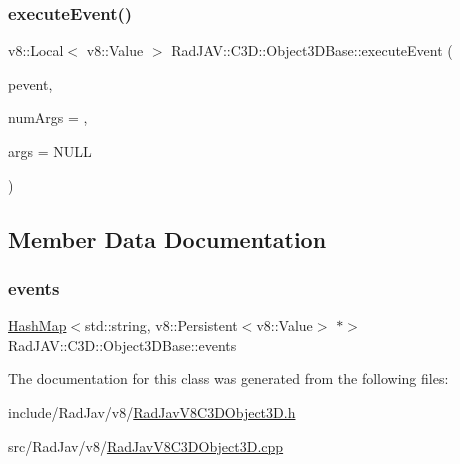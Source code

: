 \mbox{\label{class_rad_j_a_v_1_1_c3_d_1_1_object3_d_base_a802e5138705d77e4ceb1e4f02e879fd8}} 
\subsubsection{\texorpdfstring{execute\+Event()}{executeEvent()}}
{\footnotesize\ttfamily v8\+::\+Local$<$ v8\+::\+Value $>$ Rad\+J\+A\+V\+::\+C3\+D\+::\+Object3\+D\+Base\+::execute\+Event (\begin{DoxyParamCaption}\item[{v8\+::\+Persistent$<$ v8\+::\+Value $>$ $\ast$}]{pevent,  }\item[{R\+J\+I\+NT}]{num\+Args = {},  }\item[{v8\+::\+Local$<$ v8\+::\+Value $>$ $\ast$}]{args = {\ttfamily NULL} }\end{DoxyParamCaption})\hspace{0.3cm}{\ttfamily [static]}}



\subsection{Member Data Documentation}
\mbox{\label{class_rad_j_a_v_1_1_c3_d_1_1_object3_d_base_ae4be8ce97b26fb532dc8051ade916364}} 
\subsubsection{\texorpdfstring{events}{events}}
{\footnotesize\ttfamily \mbox{\hyperlink{namespace_rad_j_a_v_a7c83af3095bdd8035fd71ff008120f08}{Hash\+Map}}$<$std\+::string, v8\+::\+Persistent$<$v8\+::\+Value$>$ $\ast$$>$ Rad\+J\+A\+V\+::\+C3\+D\+::\+Object3\+D\+Base\+::events\hspace{0.3cm}{\ttfamily [protected]}}



The documentation for this class was generated from the following files\+:\begin{DoxyCompactItemize}
\item 
include/\+Rad\+Jav/v8/\mbox{\hyperlink{_rad_jav_v8_c3_d_object3_d_8h}{Rad\+Jav\+V8\+C3\+D\+Object3\+D.\+h}}\item 
src/\+Rad\+Jav/v8/\mbox{\hyperlink{_rad_jav_v8_c3_d_object3_d_8cpp}{Rad\+Jav\+V8\+C3\+D\+Object3\+D.\+cpp}}\end{DoxyCompactItemize}
